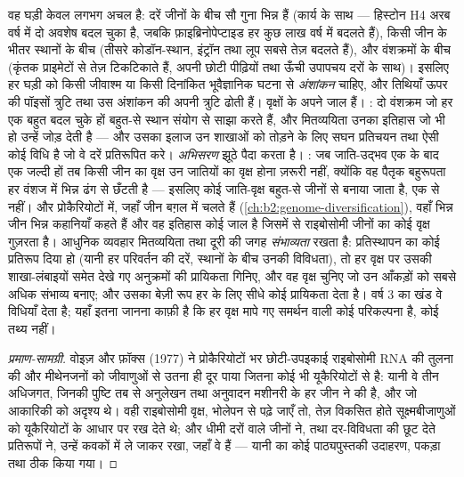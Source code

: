 \begin{proposition}[घड़ी के और वृक्षों के जाल]\label{prop:b2:phylogenetic-trees:pitfalls}
वह घड़ी केवल लगभग अचल है: दरें जीनों के बीच
सौ गुना भिन्न हैं (कार्य के साथ --- हिस्टोन H4 अरब वर्ष में
दो अवशेष बदल चुका है, जबकि फ़ाइब्रिनोपेप्टाइड हर कुछ
लाख वर्ष में बदलते हैं), किसी जीन के भीतर स्थानों के बीच (तीसरे कोडॉन-स्थान,
इंट्रॉन तथा लूप सबसे तेज़ बदलते हैं), और वंशक्रमों के बीच (कृंतक
प्राइमेटों से तेज़ टिकटिकाते हैं, अपनी छोटी पीढ़ियों तथा
ऊँची उपापचय दरों के साथ)। इसलिए हर घड़ी को किसी जीवाश्म या किसी दिनांकित
भूवैज्ञानिक घटना से \emph{अंशांकन} चाहिए, और
तिथियाँ ऊपर की पॉइसों त्रुटि तथा उस अंशांकन की अपनी त्रुटि ढोती हैं।
वृक्षों के अपने जाल हैं। \emph{}: दो
वंशक्रम जो हर एक बहुत बदल चुके हों बहुत-से स्थान संयोग से
साझा करते हैं, और मितव्ययिता उनका इतिहास जो भी हो उन्हें जोड़ देती है --- और
उसका इलाज उन शाखाओं को तोड़ने के लिए सघन प्रतिचयन तथा ऐसी कोई विधि है जो वे दरें
प्रतिरूपित करे। \emph{अभिसरण} झूठे  पैदा करता है।
\emph{}: जब जाति-उद्भव एक के बाद एक जल्दी हों तब
किसी जीन का वृक्ष उन जातियों का वृक्ष होना ज़रूरी नहीं, क्योंकि
वह पैतृक बहुरूपता हर वंशज में भिन्न ढंग से छँटती है
--- इसलिए कोई जाति-वृक्ष बहुत-से जीनों से बनाया जाता है, एक से नहीं। और
प्रोकैरियोटों में, जहाँ जीन बग़ल में चलते हैं
(\cref{ch:b2:genome-diversification}), वहाँ भिन्न जीन
भिन्न कहानियाँ कहते हैं और वह इतिहास कोई जाल है जिसमें से राइबोसोमी
जीनों का कोई वृक्ष गुज़रता है। आधुनिक व्यवहार मितव्ययिता तथा
दूरी की जगह \emph{संभाव्यता} रखता है: प्रतिस्थापन का कोई प्रतिरूप दिया हो (यानी
हर परिवर्तन की दरें, स्थानों के बीच उनकी विविधता), तो हर वृक्ष पर उसकी
शाखा-लंबाइयों समेत देखे गए अनुक्रमों की प्रायिकता गिनिए,
और वह वृक्ष चुनिए जो उन आँकड़ों को सबसे अधिक संभाव्य बनाए;
और उसका बेज़ी रूप हर  के लिए सीधे कोई प्रायिकता देता है।
वर्ष 3 का खंड वे विधियाँ देता है; यहाँ इतना जानना काफ़ी है कि
हर वृक्ष मापे गए समर्थन वाली कोई परिकल्पना है, कोई तथ्य नहीं।
\end{proposition}
\begin{proof}[प्रमाण-सामग्री]
वोइज़ और फ़ॉक्स (1977) ने प्रोकैरियोटों भर छोटी-उपइकाई राइबोसोमी RNA
की तुलना की और मीथेनजनों को जीवाणुओं से उतना ही दूर पाया
जितना कोई भी यूकैरियोटों से है: यानी वे तीन अधिजगत, जिनकी पुष्टि तब से
अनुलेखन तथा अनुवादन मशीनरी के हर जीन ने की है, और जो
आकारिकी को अदृश्य थे। वही राइबोसोमी वृक्ष, भोलेपन से पढ़े जाएँ तो,
तेज़ विकसित होते सूक्ष्मबीजाणुओं को यूकैरियोटों के आधार पर
रख देते थे; और धीमी दरों वाले जीनों ने, तथा दर-विविधता की छूट देते प्रतिरूपों ने,
उन्हें कवकों में ले जाकर रखा, जहाँ वे हैं --- यानी
 का कोई पाठ्यपुस्तकी उदाहरण, पकड़ा तथा ठीक किया गया।
\end{proof}

